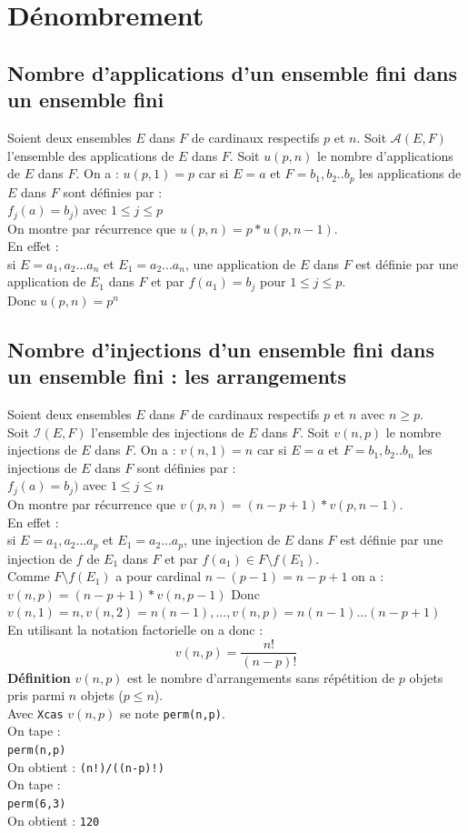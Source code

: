 \documentclass[a4paper,11pt]{book}
\begin{document}
\chapter{D\'enombrement}
\section{Nombre d'applications d'un ensemble fini dans un ensemble fini}
Soient deux ensembles $E$ dans $F$ de cardinaux respectifs $p$ et $n$.
Soit $\mathcal{A}(E,F)$ l'ensemble des applications de $E$ dans $F$.
Soit $u(p,n)$ le nombre d'applications de $E$ dans $F$.
On a :
$u(p,1)=p$ car si $E={a}$ et $F={b_1,b_2..b_p}$ les applications de $E$ dans $F$
 sont d\'efinies par :\\
$f_j(a)=b_j)$ avec $1\leq j\leq p$\\
On montre par r\'ecurrence que  $u(p,n)=p*u(p,n-1)$.\\
En effet :\\
si $E={a_1,a_2...a_n}$ et $E_1={a_2...a_n}$, une application de $E$ dans $F$ 
est d\'efinie par une application de $E_1$ dans $F$ et par $f(a_1)=b_j$ pour
$1\leq j\leq p$.\\
Donc $u(p,n)=p^n$

\section{Nombre d'injections d'un ensemble fini dans un ensemble fini : les arrangements}
Soient deux ensembles $E$ dans $F$ de cardinaux respectifs $p$ et $n$ avec 
$n\geq p$.\\
Soit $\mathcal{I}(E,F)$ l'ensemble des injections de $E$ dans $F$.
Soit $v(n,p)$ le nombre injections de $E$ dans $F$.
On a :
$v(n,1)=n$ car si $E={a}$ et $F={b_1,b_2..b_n}$ les injections de $E$ dans $F$
 sont d\'efinies par :\\
$f_j(a)=b_j)$ avec $1\leq j\leq n$\\
On montre par r\'ecurrence que  $v(p,n)=(n-p+1)*v(p,n-1)$.\\
En effet :\\
si $E={a_1,a_2...a_p}$ et $E_1={a_2...a_p}$, une injection de $E$ dans $F$ 
est d\'efinie par une injection de $f$ de $E_1$ dans $F$ et par 
$f(a_1)\in F\setminus f(E_1)$.\\
Comme $F\setminus f(E_1)$ a pour cardinal $n-(p-1)=n-p+1$ on a :\\
$v(n,p)=(n-p+1)*v(n,p-1)$
Donc $v(n,1)=n,v(n,2)=n(n-1),...,v(n,p)=n(n-1)...(n-p+1)$\\
En utilisant la notation factorielle on a donc :
$$v(n,p)=\frac{n!}{(n-p)!}$$
{\bf D\'efinition} 
$v(n,p)$ est le nombre d'arrangements sans r\'ep\'etition de $p$ objets pris 
parmi $n$ objets ($p\leq n$).\\
Avec {\tt Xcas} $v(n,p)$ se note {\tt perm(n,p)}.\\
On tape :\\
{\tt perm(n,p)}\\
On obtient :
{\tt (n!)/((n-p)!)}\\
On tape :\\
{\tt perm(6,3)}\\
On obtient :
{\tt 120}
\end{document}
